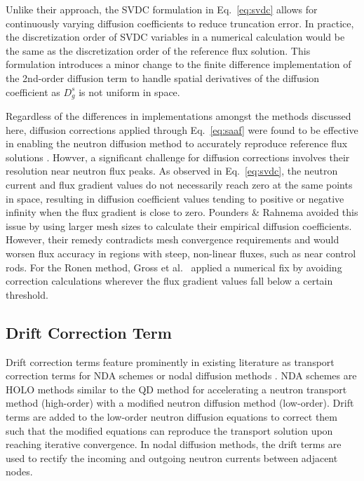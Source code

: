 Unlike their approach, the \gls{SVDC} formulation in Eq.\ \ref{eq:svdc} allows for continuously
varying diffusion coefficients to reduce truncation error. In practice, the discretization order of
\gls{SVDC} variables in a numerical calculation would be the same as the discretization order of
the reference flux solution. This formulation introduces a minor change to the finite difference
implementation of the 2nd-order diffusion term to handle spatial derivatives of the
diffusion coefficient as $D^s_g$ is not uniform in space.

Regardless of the differences in implementations amongst the methods discussed here,
diffusion corrections applied through Eq.\ \ref{eq:saaf} were
found to be effective in enabling the neutron diffusion method to accurately reproduce reference
flux solutions \cite{gross_comprehensive_2023, pounders_diffusion_2009}.
Howver, a significant challenge for diffusion corrections
involves their resolution near neutron flux peaks. As observed in Eq.\ \ref{eq:svdc}, the neutron
current and flux gradient values do not necessarily reach zero at the same points in space,
resulting in diffusion coefficient values tending to positive or negative infinity when the
flux gradient is close to zero. Pounders \& Rahnema avoided this issue by using
larger mesh sizes to calculate their empirical diffusion coefficients. However, their
remedy contradicts mesh convergence requirements and would worsen flux accuracy in regions with
steep, non-linear fluxes, such as near control rods. For the Ronen method, Gross et al.\
\cite{gross_comprehensive_2023} applied a numerical fix by avoiding correction
calculations wherever the flux gradient values fall below a certain threshold. 

\subsection{Drift Correction Term}

Drift correction terms feature prominently in existing literature as transport correction
terms for \gls{NDA} schemes or nodal diffusion methods
\cite{smith_nodal_1983, smith_assembly_1986, adams_fast_2002, wang_diffusion_2014}. \gls{NDA}
schemes are \gls{HOLO} methods \cite{chacon_multiscale_2017} similar to the \gls{QD} method for
accelerating a neutron transport
method (high-order) with a modified neutron diffusion method (low-order). Drift terms
are added to the low-order neutron diffusion equations to correct them such that the modified
equations can reproduce the transport solution upon reaching iterative convergence. In nodal
diffusion methods, the drift terms are used to rectify the incoming and outgoing neutron
currents between adjacent nodes.

